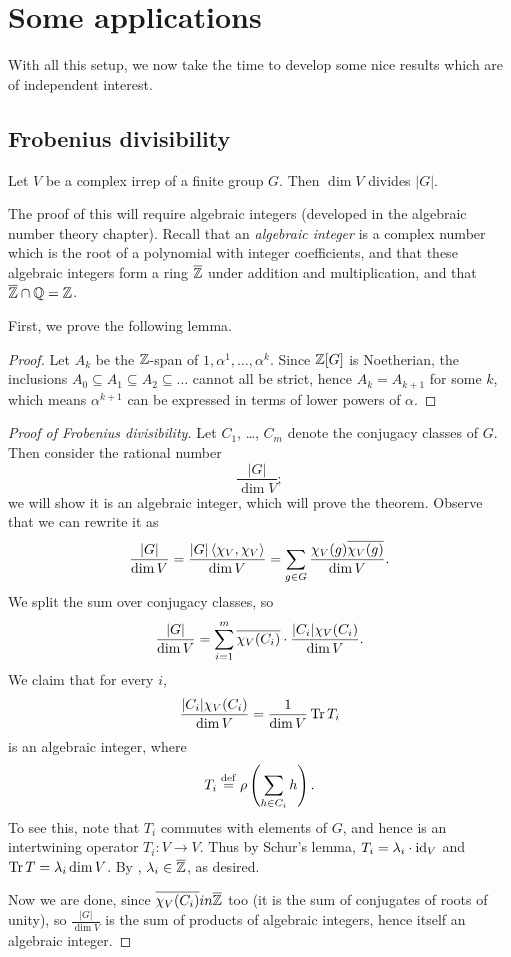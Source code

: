 \chapter{Some applications}
With all this setup, we now take the time to develop some nice
results which are of independent interest.

\section{Frobenius divisibility}
\begin{theorem}
	Let $V$ be a complex irrep of a finite group $G$.
	Then $\dim V$ divides $|G|$.
\end{theorem}
The proof of this will require algebraic integers
(developed in the algebraic number theory chapter).
Recall that an \emph{algebraic integer} is a complex number
which is the root of a polynomial with integer coefficients,
and that these algebraic integers form a ring $\overline{\mathbb Z}$
under addition and multiplication, and that $\overline{\mathbb Z} \cap \mathbb Q = \mathbb Z$.

First, we prove the following lemma.
\newcommand{\tempuuujbhtkx}{$\ZZ[G]$}
\begin{proof}
	Let $A_k$ be the $\mathbb Z$-span of $1, \alpha^1, \dots, \alpha^k$.
	Since $\mathbb Z[G]$ is Noetherian,
	the inclusions $A_0 \subseteq A_1 \subseteq A_2 \subseteq \dots$
	cannot all be strict, hence $A_k = A_{k+1}$ for some $k$,
	which means $\alpha^{k+1}$ can be expressed in terms of
	lower powers of $\alpha$.
\end{proof}

\begin{proof}
	[Proof of Frobenius divisibility]
	Let $C_1$, \dots, $C_m$ denote the conjugacy classes of $G$.
	Then consider the rational number \[ \frac{|G|}{\dim V}; \]
	we will show it is an algebraic integer, which will prove the theorem.
	Observe that we can rewrite it as
	\[
		\frac{|G|}{\dim V}
		= \frac{|G| \left< \chi_V, \chi_V \right>}{\dim V}
		= \sum_{g \in G} \frac{\chi_V(g) \overline{\chi_V(g)}}{\dim V}.
	\]
	We split the sum over conjugacy classes, so
	\[
		\frac{|G|}{\dim V}
		=
		\sum_{i=1}^m \overline{\chi_V(C_i)} \cdot \frac{|C_i| \chi_V(C_i)}{\dim V}.
	\]
	We claim that for every $i$,
	\[ \frac{|C_i| \chi_V(C_i)}{\dim V}
		= \frac{1}{\dim V} \operatorname{Tr} T_i \]
	is an algebraic integer,
	where \[ T_i \overset{\mathrm{def}}{=} \rho\left(\sum_{h \in C_i} h\right). \]
	To see this, note that $T_i$ commutes with elements of $G$,
	and hence is an intertwining operator $T_i : V \to V$.
	Thus by Schur's lemma, $T_i = \lambda_i \cdot \mathrm{id}_V$
	and $\operatorname{Tr} T = \lambda_i \dim V$.
	By , $\lambda_i \in \overline{\mathbb Z}$, as desired.
	
	Now we are done, since $ in \ol\ZZ$ too
	(it is the sum of conjugates of roots of unity),
	so $$ is the sum of products of algebraic integers,
	hence itself an algebraic integer.
\end{proof}

